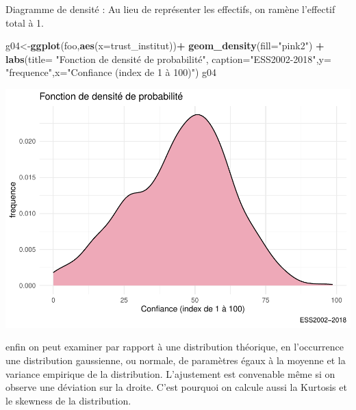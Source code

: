 \documentclass[
]{book}
\newenvironment{Shaded}{\begin{snugshade}}{\end{snugshade}}
\newcommand{\DataTypeTok}[1]{\textcolor[rgb]{0.13,0.29,0.53}{#1}}
\newcommand{\KeywordTok}[1]{\textcolor[rgb]{0.13,0.29,0.53}{\textbf{#1}}}
\newcommand{\NormalTok}[1]{#1}
\newcommand{\OperatorTok}[1]{\textcolor[rgb]{0.81,0.36,0.00}{\textbf{#1}}}
\newcommand{\StringTok}[1]{\textcolor[rgb]{0.31,0.60,0.02}{#1}}
\begin{document}
Diagramme de densité : Au lieu de représenter les effectifs, on ramène l'effectif total à 1.

\begin{Shaded}
\begin{Highlighting}[]
\NormalTok{g04<-}\KeywordTok{ggplot}\NormalTok{(foo,}\KeywordTok{aes}\NormalTok{(}\DataTypeTok{x=}\NormalTok{trust_institut))}\OperatorTok{+}\StringTok{ }
\StringTok{  }\KeywordTok{geom_density}\NormalTok{(}\DataTypeTok{fill=}\StringTok{"pink2"}\NormalTok{) }\OperatorTok{+}
\StringTok{  }\KeywordTok{labs}\NormalTok{(}\DataTypeTok{title=} \StringTok{"Fonction de densité de probabilité"}\NormalTok{, }\DataTypeTok{caption=}\StringTok{"ESS2002-2018"}\NormalTok{,}\DataTypeTok{y=} \StringTok{"frequence"}\NormalTok{,}\DataTypeTok{x=}\StringTok{"Confiance (index de 1 à 100)"}\NormalTok{) }
\NormalTok{g04}
\end{Highlighting}
\end{Shaded}

\includegraphics{bookdown-demo_files/figure-latex/304-1.pdf}

enfin on peut examiner par rapport à une distribution théorique, en l'occurrence une distribution gaussienne, ou normale, de paramètres égaux à la moyenne et la variance empirique de la distribution. L'ajustement est convenable même si on observe une déviation sur la droite. C'est pourquoi on calcule aussi la Kurtosis et le skewness de la distribution.
\end{document}
